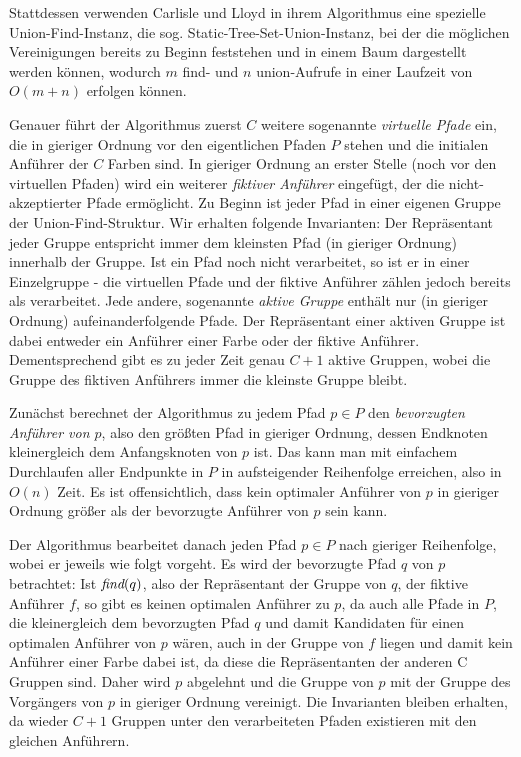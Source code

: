 Stattdessen verwenden Carlisle und Lloyd in ihrem Algorithmus eine spezielle Union-Find-Instanz, die sog.
Static-Tree-Set-Union-Instanz, bei der die möglichen Vereinigungen bereits zu Beginn feststehen und in einem Baum
dargestellt werden können, wodurch  $m$ find- und $n$ union-Aufrufe in einer Laufzeit von $O(m + n)$ erfolgen können.

Genauer führt der Algorithmus zuerst $C$ weitere sogenannte {\em virtuelle Pfade} ein, die in gieriger Ordnung
vor den eigentlichen Pfaden $P$ stehen und die initialen Anführer der $C$ Farben sind.
In gieriger Ordnung an erster Stelle (noch vor den virtuellen Pfaden) wird ein weiterer {\em fiktiver Anführer}
eingefügt, der die  nicht-akzeptierter Pfade ermöglicht.
Zu Beginn ist jeder Pfad in einer eigenen Gruppe der Union-Find-Struktur.
Wir erhalten folgende Invarianten:
Der Repräsentant jeder Gruppe entspricht immer dem kleinsten Pfad (in gieriger Ordnung) innerhalb der Gruppe.
Ist ein Pfad noch nicht verarbeitet, so ist er in einer Einzelgruppe - die virtuellen Pfade und der fiktive Anführer
zählen jedoch bereits als verarbeitet.
Jede andere, sogenannte {\em aktive Gruppe} enthält nur (in gieriger Ordnung) aufeinanderfolgende Pfade.
Der Repräsentant einer aktiven Gruppe ist dabei entweder ein Anführer einer Farbe oder der fiktive Anführer.
Dementsprechend gibt es zu jeder Zeit genau $C+1$ aktive Gruppen, wobei die Gruppe des fiktiven
Anführers immer die kleinste Gruppe bleibt.

Zunächst berechnet der Algorithmus zu jedem Pfad $p \in P$ den {\em bevorzugten Anführer von $p$}, also den größten Pfad in
gieriger Ordnung, dessen Endknoten kleinergleich dem Anfangsknoten von $p$ ist.
Das kann man mit einfachem Durchlaufen aller Endpunkte in $P$ in aufsteigender Reihenfolge erreichen, also in $O(n)$
Zeit.
Es ist offensichtlich, dass kein optimaler Anführer von $p$ in gieriger Ordnung größer als der bevorzugte Anführer von
$p$ sein kann.

Der Algorithmus bearbeitet danach jeden Pfad $p \in P$ nach gieriger Reihenfolge, wobei er jeweils wie folgt vorgeht.
Es wird der bevorzugte Pfad $q$ von $p$ betrachtet:
Ist $\text{\em find}(q)$, also der Repräsentant der Gruppe von $q$, der fiktive Anführer $f$, so gibt es keinen optimalen Anführer
zu $p$, da auch alle Pfade in $P$, die kleinergleich dem bevorzugten Pfad $q$ und damit Kandidaten für einen optimalen
Anführer von $p$ wären, auch in der Gruppe von $f$ liegen und damit kein Anführer einer Farbe dabei ist, da diese die
Repräsentanten der anderen C Gruppen sind.
Daher wird $p$ abgelehnt und die Gruppe von $p$ mit der Gruppe des Vorgängers von $p$ in gieriger Ordnung vereinigt.
Die Invarianten bleiben erhalten, da wieder $C+1$ Gruppen unter den verarbeiteten Pfaden existieren mit den gleichen
Anführern.

